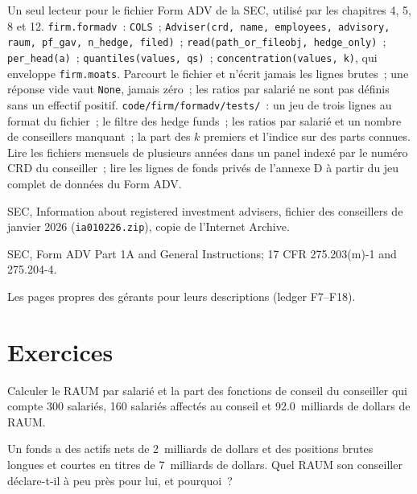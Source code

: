 \begin{build}
 Un seul lecteur pour le fichier Form ADV de la SEC, utilisé par les chapitres 4, 5, 8 et 12.
 \texttt{firm.formadv}~: \texttt{COLS}~;
\texttt{Adviser(crd, name, employees, advisory, raum, pf\_gav, n\_hedge, filed)}~; \texttt{read(path\_or\_fileobj, hedge\_only)}~; \texttt{per\_head(a)}~;
\texttt{quantiles(values, qs)}~; \texttt{concentration(values, k)}, qui enveloppe \texttt{firm.moats}.
 Parcourt le fichier et n'écrit jamais les lignes brutes~; une réponse vide vaut \texttt{None}, jamais zéro~; les
ratios par salarié ne sont pas définis sans un effectif positif.
 \texttt{code/firm/formadv/tests/}~: un jeu de trois lignes au format du fichier~; le filtre des hedge
funds~; les ratios par salarié et un nombre de conseillers manquant~; la part des $k$ premiers et l'indice sur des parts connues.
 Lire les fichiers mensuels de plusieurs années dans un panel indexé par le numéro CRD du conseiller~; lire les
lignes de fonds privés de l'annexe D à partir du jeu complet de données du Form ADV.
\end{build}

\begin{omsources}
\item SEC, Information about registered investment advisers, fichier des conseillers de janvier 2026 (\texttt{ia010226.zip}),
copie de l'Internet Archive.
\item SEC, Form ADV Part 1A and General Instructions; 17 CFR 275.203(m)-1 and 275.204-4.
\item Les pages propres des gérants pour leurs descriptions (ledger F7--F18).
\end{omsources}

\section{Exercices}

\begin{exercise}[$\star$]\label{exo:in:quantitative-hedge-funds-and-systematic-managers:1}
Calculer le RAUM par salarié et la part des fonctions de conseil du conseiller qui compte 300 salariés, 160 salariés affectés au conseil et
92.0~milliards de dollars de RAUM.
\end{exercise}

\begin{exercise}[$\star$]\label{exo:in:quantitative-hedge-funds-and-systematic-managers:2}
Un fonds a des actifs nets de 2~milliards de dollars et des positions brutes longues et courtes en titres de 7~milliards de dollars. Quel RAUM
son conseiller déclare-t-il à peu près pour lui, et pourquoi~?
\end{exercise}

